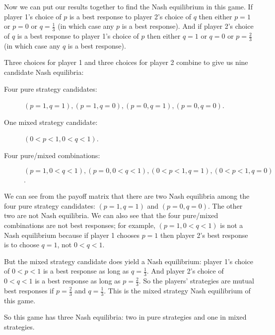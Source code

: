 Now we can put our results together to find the Nash equilibrium in this game. If player 1's choice of $p$ is a best response to player 2's choice of $q$ then either $p=1$ or $p=0$ or $q=\frac{1}{3}$ (in which case any $p$ is a best response). And if player 2's choice of $q$ is a best response to player 1's choice of $p$ then either $q=1$ or $q=0$ or $p=\frac{2}{3}$ (in which case any $q$ is a best response).

Three choices for player 1 and three choices for player 2 combine to give us nine candidate Nash equilibria:
\begin{description}
\item[Four pure strategy candidates:] $(p=1, q=1), (p=1, q=0), (p=0, q=1), (p=0, q=0)$.

\item[One mixed strategy candidate:] $(0<p<1, 0<q<1)$.

\item[Four pure/mixed combinations:] $(p=1, 0<q<1), (p=0, 0<q<1), (0<p<1, q=1), (0<p<1, q=0)$.
\end{description}
%
We can see from the payoff matrix that there are two Nash equilibria among the four pure strategy candidates: $(p=1, q=1)$ and $(p=0, q=0)$. The other two are not Nash equilibria. We can also see that the four pure/mixed combinations are not best responses; for example, $(p=1, 0<q<1)$ is not a Nash equilibrium because if player 1 chooses $p=1$ then player 2's best response is to choose $q=1$, not $0<q<1$.

But the mixed strategy candidate does yield a Nash equilibrium: player 1's choice of $0<p<1$ is a best response as long as $q=\frac{1}{3}$. And player 2's choice of $0<q<1$ is a best response as long as $p=\frac{2}{3}$. So the players' strategies are mutual best responses if $p=\frac{2}{3}$ and $q=\frac{1}{3}$. This is the mixed strategy Nash equilibrium of this game.

So this game has three Nash equilibria: two in pure strategies and one in mixed strategies.



\clearpage


%
%
%





